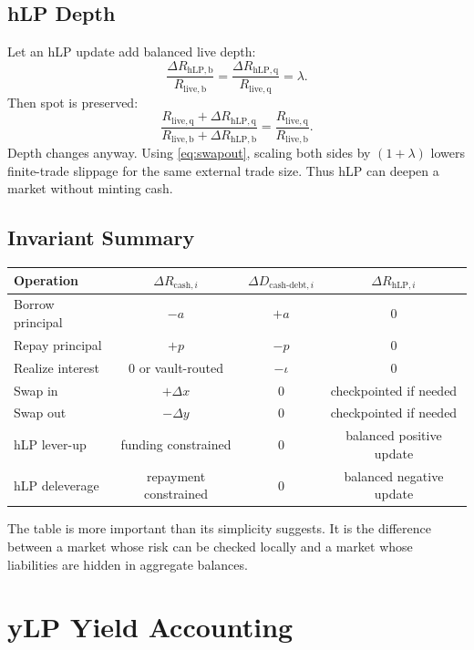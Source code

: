\documentclass[11pt]{article}
\newcommand{\base}{\mathrm{b}}
\newcommand{\qasset}{\mathrm{q}}
\newcommand{\cash}{\mathrm{cash}}
\newcommand{\live}{\mathrm{live}}
\newcommand{\hlp}{\mathrm{hLP}}
\newcommand{\debt}{\mathrm{debt}}
\begin{document}
\subsection{hLP Depth}

Let an hLP update add balanced live depth:
\begin{equation}
\frac{\Delta R_{\hlp,\base}}{R_{\live,\base}}
=
\frac{\Delta R_{\hlp,\qasset}}{R_{\live,\qasset}}
=\lambda.
\end{equation}
Then spot is preserved:
\begin{equation}
\frac{R_{\live,\qasset}+\Delta R_{\hlp,\qasset}}
{R_{\live,\base}+\Delta R_{\hlp,\base}}
=
\frac{R_{\live,\qasset}}{R_{\live,\base}}.
\end{equation}
Depth changes anyway. Using \eqref{eq:swapout}, scaling both sides by $(1+\lambda)$ lowers finite-trade slippage for the same external trade size. Thus hLP can deepen a market without minting cash.

\subsection{Invariant Summary}

\begin{center}
\begin{tabular}{lccc}
\toprule
Operation & $\Delta R_{\cash,i}$ & $\Delta D_{\cash\text{-}\debt,i}$ & $\Delta R_{\hlp,i}$ \\
\midrule
Borrow principal & $-a$ & $+a$ & $0$ \\
Repay principal & $+p$ & $-p$ & $0$ \\
Realize interest & $0$ or vault-routed & $-\iota$ & $0$ \\
Swap in & $+\Delta x$ & $0$ & checkpointed if needed \\
Swap out & $-\Delta y$ & $0$ & checkpointed if needed \\
hLP lever-up & funding constrained & $0$ & balanced positive update \\
hLP deleverage & repayment constrained & $0$ & balanced negative update \\
\bottomrule
\end{tabular}
\end{center}

The table is more important than its simplicity suggests. It is the difference between a market whose risk can be checked locally and a market whose liabilities are hidden in aggregate balances.

\section{yLP Yield Accounting}
\end{document}
